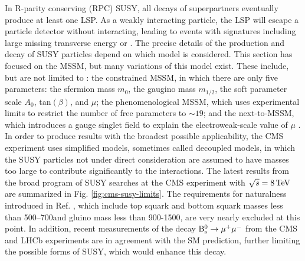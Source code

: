 In R-parity conserving (RPC) SUSY, all decays of superpartners eventually produce at least one LSP. As a weakly interacting particle, the LSP will escape a particle detector without interacting, leading to events with signatures including large missing transverse energy or \met. The precise details of the production and decay of SUSY particles depend on which model is considered. This section has focused on the MSSM, but many variations of this model exist. These include, but are not limited to \cite{PDG}: the constrained MSSM, in which there are only five parameters: the sfermion mass $m_0$, the gaugino mass $m_{1/2}$, the soft parameter scale $A_{0}$, $\text{tan}(\beta)$, and $\mu$; the phenomenological MSSM, which uses experimental limits to restrict the number of free parameters to ${\sim}19$; and the next-to-MSSM, which introduces a gauge singlet field to explain the electroweak-scale value of $\mu$ \cite{NMSSM}. In order to produce results with the broadest possible applicability, the CMS experiment uses simplified models, sometimes called decoupled models, in which the SUSY particles not under direct consideration are assumed to have masses too large to contribute significantly to the interactions. The latest results from the broad program of SUSY searches at the CMS experiment with $\sqrt{s}=8\,\text{Te\hspace{-.08em}V}$ are summarized in Fig. \ref{fig:cms-susy-limits}. The requirements for naturalness introduced in Ref. \cite{NaturalSUSY}, which include top squark and bottom squark masses less than 500--700\GeV and gluino mass less than 900-1500\GeV, are very nearly excluded at this point. In addition, recent measurements of the decay $\mathrm{B}^{0}_{\mathrm{s}} \rightarrow \mu^{+} \mu^{-}$ from the CMS \cite{CMS-BSmumu} and LHCb \cite{LHCb-BSmumu} experiments are in agreement with the SM prediction, further limiting the possible forms of SUSY, which would enhance this decay.

